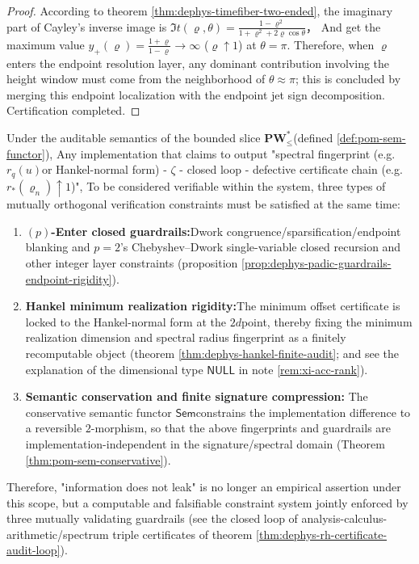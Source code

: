 \begin{proof}
According to theorem \ref{thm:dephys-timefiber-two-ended}, the imaginary part of Cayley’s inverse image is
\(
\Im t(\varrho,\theta)=\frac{1-\varrho^2}{1+\varrho^2+2\varrho\cos\theta}
\)，
And get the maximum value \(y_+(\varrho)=\frac{1+\varrho}{1-\varrho}\to\infty\) (\(\varrho\uparrow 1\)) at \(\theta=\pi\).
Therefore, when \(\varrho\) ​​enters the endpoint resolution layer, any dominant contribution involving the height window must come from the neighborhood of \(\theta\approx\pi\); this is concluded by merging this endpoint localization with the endpoint jet sign decomposition. Certification completed.
\end{proof}

\begin{theorem}\label{thm:xi-triple-consistency-audit}
Under the auditable semantics of the bounded slice \(\mathbf{PW}^{\ast}_{\le}\) ​​(defined \ref{def:pom-sem-functor}),
Any implementation that claims to output "spectral fingerprint (e.g. \(r_q(u)\) ​​or Hankel-normal form) - \(\zeta\) - closed loop - defective certificate chain (e.g. \(r_\ast(\varrho_n)\uparrow 1\))",
To be considered verifiable within the system, three types of mutually orthogonal verification constraints must be satisfied at the same time:
\begin{enumerate}
  \item \textbf{\((p)\)-Enter closed guardrails:}Dwork congruence/sparsification/endpoint blanking and \(p=2\)’s Chebyshev--Dwork single-variable closed recursion and other integer layer constraints (proposition \ref{prop:dephys-padic-guardrails-endpoint-rigidity}).
  \item \textbf{Hankel minimum realization rigidity:}The minimum offset certificate is locked to the Hankel-normal form at the \(2d\) ​​point, thereby fixing the minimum realization dimension and spectral radius fingerprint as a finitely recomputable object (theorem \ref{thm:dephys-hankel-finite-audit}; and see the explanation of the dimensional type \(\mathsf{NULL}\) in note \ref{rem:xi-acc-rank}).
  \item \textbf{Semantic conservation and finite signature compression:} The conservative semantic functor \(\mathsf{Sem}\) ​​constrains the implementation difference to a reversible \(2\)-morphism, so that the above fingerprints and guardrails are implementation-independent in the signature/spectral domain (Theorem \ref{thm:pom-sem-conservative}).
\end{enumerate}
Therefore, "information does not leak" is no longer an empirical assertion under this scope, but a computable and falsifiable constraint system jointly enforced by three mutually validating guardrails (see the closed loop of analysis-calculus-arithmetic/spectrum triple certificates of theorem \ref{thm:dephys-rh-certificate-audit-loop}).
\end{theorem}

